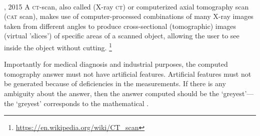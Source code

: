 
\begin{example} \label{eg:ctscan}
\ 
\begin{quoted}{, 2015}
A \textsc{ct}-scan, also called     (X-ray \textsc{ct}) or computerized axial {tomography} scan (\textsc{cat} scan), makes use of computer-processed combinations of many X-ray images taken from different angles to produce cross-sectional (tomographic) images (virtual 'slices') of specific areas of a scanned object, allowing the user to see inside the object without cutting.
\footnote{\protect\url{https://en.wikipedia.org/wiki/CT\_scan}}
\end{quoted}
Importantly for medical diagnosis and industrial purposes, the computed tomography answer must not have artificial features.
Artificial features must not be generated because of deficiencies in the measurements.
If there is any ambiguity about the answer, then the answer computed should be the `greyest'---the `greyest' corresponds to the mathematical .


\end{example}
